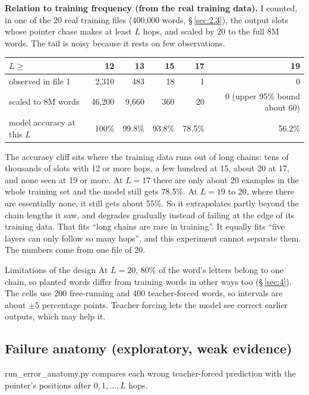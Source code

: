 \documentclass[paper=a4,fontsize=11pt,DIV=11,parskip=half,headings=small,numbers=noendperiod]{scrartcl}
\DeclareRobustCommand{\lead}[1]{\textsf{\bfseries\color{accent}#1}}
\DeclareRobustCommand{\code}[1]{{\fontseries{m}\ttfamily #1}}
\DeclareRobustCommand{\hdr}[1]{\textsf{\bfseries #1}}
\begin{document}
\lead{Relation to training frequency (from the real training data).} I counted, in one of the 20 real training
files (400,000 words, \S\,\ref{sec:2.3}), the output slots whose pointer chase makes at least $L$ hops, and
scaled by 20 to the full 8M words. The tail is noisy because it rests on few observations.

\begin{center}\small
\begin{tabular}{@{}l r r r r r@{}}
\toprule
\hdr{$L \ge$} & \hdr{12} & \hdr{13} & \hdr{15} & \hdr{17} & \hdr{19} \\
\midrule
observed in file 1 & 2,310 & 483 & 18 & 1 & 0 \\
scaled to 8M words & 46,200 & 9,660 & 360 & 20 & 0 (upper 95\% bound about 60) \\
model accuracy at this $L$ & 100\% & 99.8\% & 93.8\% & 78.5\% & 56.2\% \\
\bottomrule
\end{tabular}
\end{center}

The accuracy cliff sits where the training data runs out of long chains: tens of thousands of slots with 12 or
more hops, a few hundred at 15, about 20 at 17, and none seen at 19 or more. At $L=17$ there are only about 20
examples in the whole training set and the model still gets 78.5\%. At $L=19$ to 20, where there are essentially
none, it still gets about 55\%. So it extrapolates partly beyond the chain lengths it saw, and degrades
gradually instead of failing at the edge of its training data. That fits “long chains are rare in training”. It
equally fits “five layers can only follow so many hops”, and this experiment cannot separate them. The numbers
come from one file of 20.

\begin{limbox}{Limitations of the design}
At $L=20$, 80\% of the word’s letters belong to one chain, so planted words differ from training words in other
ways too (\S\,\ref{sec:4}). The cells use 200 free-running and 400 teacher-forced words, so intervals are about
\ensuremath{\pm}5 percentage points. Teacher forcing lets the model see correct earlier outputs, which may help
it.
\end{limbox}

\subsection{Failure anatomy (exploratory, weak evidence)}\label{sec:3.4}
\code{run\_\allowbreak{}error\_\allowbreak{}anatomy.\allowbreak{}py} compares each wrong teacher-forced
prediction with the pointer’s positions after $0,1,\dots,L$ hops.
\end{document}
